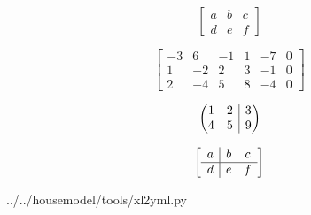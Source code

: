 \[
\left[
\begin{array}{cc|c}
	a & b & c \\
	d & e & f
\end{array}
\right]
\]

\[
\left[\begin{array}{rrrrr|r}
	-3 & 6 & -1 & 1 & -7 & 0\\
	1 & -2 & 2 & 3 & -1 & 0\\
	2 & -4 & 5 & 8 & -4 & 0
\end{array}\right]
\]

\[
\left(\hspace{-5pt}\begin{array}{cc|c}
	1 & 2 & 3 \\
	4 & 5 & 9
\end{array}\hspace{-5pt}\right)
\]

\[
    \left[\begin{array}{c|c c} 
	a & b & c\\ 
	\hline 
	d & e & f 
\end{array}\right] 
\]

 
{../../housemodel/tools/xl2yml.py}

\newpage
